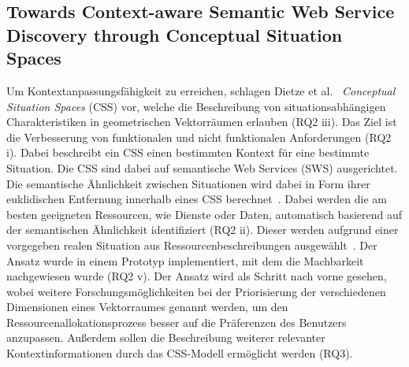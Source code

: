 \documentclass[conference,compsoc]{IEEEtran}
\begin{document}
\subsection{Towards Context-aware Semantic Web Service Discovery through Conceptual Situation Spaces}
Um Kontextanpassungsfähigkeit zu erreichen, schlagen Dietze et al.~\cite{dietze2008towards} \textit{Conceptual Situation Spaces} (CSS) vor, welche die Beschreibung von situationsabhängigen Charakteristiken in geometrischen Vektorräumen erlauben (RQ2 iii). Das Ziel ist die Verbesserung von funktionalen und nicht funktionalen Anforderungen (RQ2 i). Dabei beschreibt ein CSS einen bestimmten Kontext für eine bestimmte Situation. Die CSS sind dabei auf semantische Web Services (SWS) ausgerichtet. Die semantische Ähnlichkeit zwischen Situationen wird dabei in Form ihrer euklidischen Entfernung innerhalb eines CSS berechnet~\cite{dietze2008towards}. Dabei werden die am besten geeigneten Ressourcen, wie Dienste oder Daten, automatisch basierend auf der semantischen Ähnlichkeit identifiziert (RQ2 ii). Dieser werden aufgrund einer vorgegeben realen Situation aus Ressourcenbeschreibungen ausgewählt~\cite{dietze2008towards}.
Der Ansatz wurde in einem Prototyp implementiert, mit dem die Machbarkeit nachgewiesen wurde (RQ2 v).
Der Ansatz wird als Schritt nach vorne gesehen, wobei weitere Forschungsmöglichkeiten bei der Priorisierung der verschiedenen Dimensionen eines Vektorraumes genannt werden, um den Ressourcenallokationsprozess besser auf die Präferenzen des Benutzers anzupassen. Außerdem sollen die Beschreibung weiterer relevanter Kontextinformationen durch das CSS-Modell ermöglicht werden (RQ3).
\end{document}
